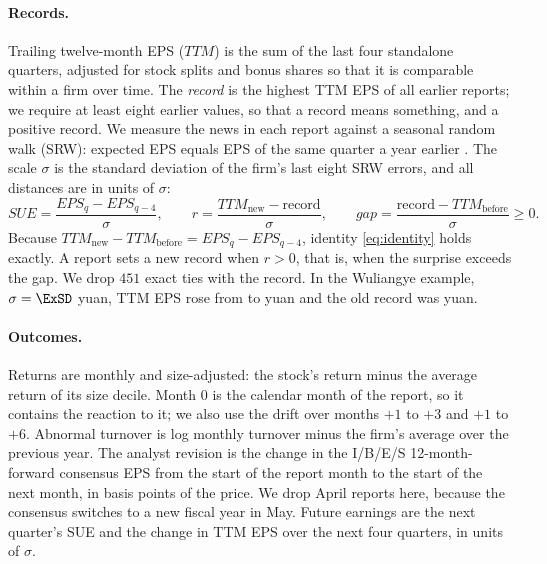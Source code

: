 \documentclass[11pt]{article}
\newcommand{\SUE}{\mathit{SUE}}
\newcommand{\gap}{\mathit{gap}}
\newcommand{\TTM}{\mathit{TTM}}
\begin{document}
\paragraph{Records.} Trailing twelve-month EPS ($\TTM$) is the sum of the last four standalone quarters, adjusted for
stock splits and bonus shares so that it is comparable within a firm over time. The \emph{record} is the highest TTM EPS
of all earlier reports; we require at least eight earlier values, so that a record means something, and a positive
record. We measure the news in each report against a seasonal random walk (SRW): expected EPS equals EPS of the same
quarter a year earlier \citep{foster1977,bernard1990}. The scale $\sigma$ is the standard deviation of the firm's last
eight SRW errors, and all distances are in units of $\sigma$:
\begin{equation*}
\SUE = \frac{\mathit{EPS}_q-\mathit{EPS}_{q-4}}{\sigma},\qquad
r = \frac{\TTM_{\mathrm{new}}-\mathrm{record}}{\sigma},\qquad
\gap = \frac{\mathrm{record}-\TTM_{\mathrm{before}}}{\sigma}\geq 0 .
\end{equation*}
Because $\TTM_{\mathrm{new}}-\TTM_{\mathrm{before}}=\mathit{EPS}_q-\mathit{EPS}_{q-4}$, identity \eqref{eq:identity}
holds exactly. A report sets a new record when $r>0$, that is, when the surprise exceeds the gap. We drop
\(451\) exact ties with the record. In the Wuliangye example, $\sigma=\ExSD$ yuan, TTM EPS rose from \ExTTMprev{} to
\ExTTM{} yuan and the old record was \ExRecord{} yuan.

\paragraph{Outcomes.} Returns are monthly and size-adjusted: the stock's return minus the average return of its size
decile. Month 0 is the calendar month of the report, so it contains the reaction to it; we also use the drift over
months $+1$ to $+3$ and $+1$ to $+6$. Abnormal turnover is log monthly turnover minus the firm's average over the
previous year. The analyst revision is the change in the I/B/E/S 12-month-forward consensus EPS from the start of the
report month to the start of the next month, in basis points of the price. We drop April reports here, because the
consensus switches to a new fiscal year in May. Future earnings are the next quarter's SUE and the change in TTM EPS
over the next four quarters, in units of $\sigma$.
\end{document}
